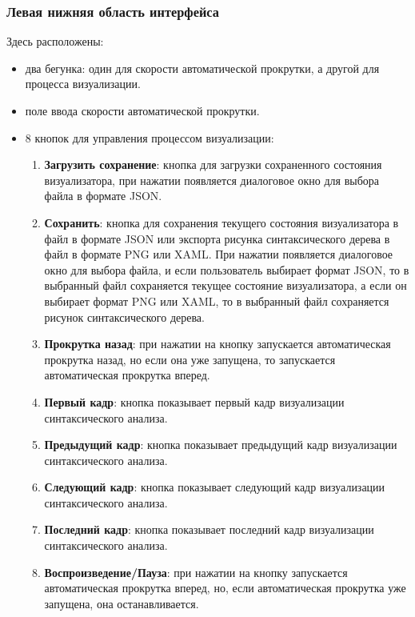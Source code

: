 \documentclass[a4paper,12pt]{article}
\begin{document}
  \subsubsection{Левая нижняя область интерфейса}
  \label{sec:a1}
  Здесь расположены:
  \begin{itemize}
    \item два бегунка: один для скорости автоматической прокрутки,
    а другой для процесса визуализации. 
    \item поле ввода скорости автоматической прокрутки. 
    \item 8 кнопок для управления процессом визуализации: 
    \begin{enumerate}
      \item \textbf{Загрузить сохранение}: кнопка для загрузки сохраненного состояния визуализатора,
      при нажатии появляется диалоговое окно для выбора файла в формате JSON.
      \item \textbf{Сохранить}: кнопка для сохранения текущего состояния визуализатора в файл в формате JSON
      или экспорта рисунка синтаксического дерева в файл в формате PNG или XAML.
      При нажатии появляется диалоговое окно для выбора файла, и если пользователь выбирает формат JSON,
      то в выбранный файл сохраняется текущее состояние визуализатора, а если он выбирает формат PNG или XAML,
      то в выбранный файл сохраняется рисунок синтаксического дерева. 
      \item \textbf{Прокрутка назад}: при нажатии на кнопку запускается автоматическая прокрутка назад,
      но если она уже запущена, то запускается автоматическая прокрутка вперед.
      \item \textbf{Первый кадр}: кнопка показывает первый кадр визуализации синтаксического анализа.
      \item \textbf{Предыдущий кадр}: кнопка показывает предыдущий кадр визуализации синтаксического анализа.
      \item \textbf{Следующий кадр}: кнопка показывает следующий кадр визуализации синтаксического анализа.
      \item \textbf{Последний кадр}: кнопка показывает последний кадр визуализации синтаксического анализа.
      \item \textbf{Воспроизведение/Пауза}: при нажатии на кнопку запускается автоматическая прокрутка вперед,
      но, если автоматическая прокрутка уже запущена, она останавливается.
    \end{enumerate}
  \end{itemize}
\end{document}
